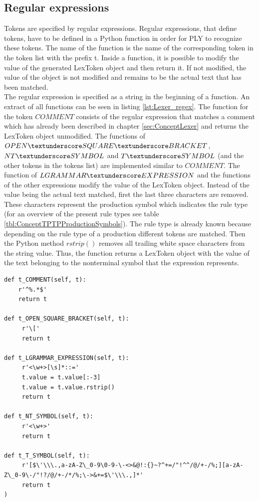 \subsection{Regular expressions}\label{sec:ImplementationLexerRegularExpression}

Tokens are specified by regular expressions.
Regular expressions, that define tokens, have to be defined in a Python function in order for \ac{PLY} to recognize these tokens.
The name of the function is the name of the corresponding token in the token list with the prefix t\textunderscore .
Inside a function, it is possible to modify the value of the generated LexToken object and then return it.
If not modified, the value of the object is not modified and remains to be the actual text that has been matched.\\
The regular expression is specified as a string in the beginning of a function.
An extract of all functions can be seen in listing \ref{lst:Lexer_regex}.
The function for the token $COMMENT$ consists of the regular expression that matches a comment which has already been described in chapter \ref{sec:ConceptLexer} and returns the LexToken object unmodified.
The functions of $OPEN\textunderscore SQUARE\textunderscore BRACKET$, $NT\textunderscore SYMBOL$ and $T\textunderscore SYMBOL$ (and the other tokens in the tokens list) are implemented similar to $COMMENT$.
The function of $LGRAMMAR\textunderscore EXPRESSION$ and the functions of the other expressions modify the value of the LexToken object.
Instead of the value being the actual text matched, first the last three characters are removed.
These characters represent the production symbol which indicates the rule type (for an overview of the present rule types see table \ref{tbl:ConceptTPTPProductionSymbols}).
The rule type is already known because depending on the rule type of a production different tokens are matched.
Then the Python method $rstrip()$ removes all trailing white space characters from the string value.
Thus, the function returns a LexToken object with the value of the text belonging to the nonterminal symbol that the expression represents.\\

\begin{lstlisting}[language=None,basicstyle=\scriptsize	,caption= Lexer regular expressions,label= lst:Lexer_regex]
def t_COMMENT(self, t):
    r'^%.*$'
    return t

def t_OPEN_SQUARE_BRACKET(self, t):
     r'\['
     return t

def t_LGRAMMAR_EXPRESSION(self, t):
     r'<\w+>[\s]*::='
     t.value = t.value[:-3]
     t.value = t.value.rstrip()
     return t

def t_NT_SYMBOL(self, t):
     r'<\w+>'
     return t

def t_T_SYMBOL(self, t):
     r'[$\'\\\.,a-zA-Z\_0-9\0-9-\-<>&@!:{}~?^+=/"!^^/@/+-/%;][a-zA-Z\_0-9\-/"!?/@/+-/*/%;\->&+=$\'\\\.,]*'
     return t
)
\end{lstlisting}

